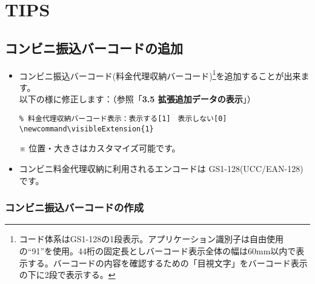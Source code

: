 \documentclass[a4paper,10pt,titlepage]{ltjsarticle}
\def\colH#1{\color[HTML]{#1}}
\newcommand\visibleExtension{1}
\begin{document}
\newpage

\section{TIPS}

\subsection{コンビニ振込バーコードの追加}

\begin{itemize}
  \item {\colH{800000} コンビニ振込バーコード}(料金代理収納バーコード)\footnote{コード体系はGS1-128の1段表示。アプリケーション識別子は自由使用の“91”を使用。44桁の固定長としバーコード表示全体の幅は60mm以内で表示する。バーコードの内容を確認するための「目視文字」をバーコード表示の下に2段で表示する。}を追加することが出来ます。\\
以下の様に修正します：（参照「{\bfseries 3.5 拡張追加データの表示}」）
\begin{verbatim}
% 料金代理収納バーコード表示：表示する[1]　表示しない[0]
\newcommand\visibleExtension{1}
\end{verbatim}
  \item[\hspace{30pt}※] 位置・大きさはカスタマイズ可能です。 
  \item コンビニ料金代理収納に利用されるエンコードは{\colH{800000} GS1-128}(UCC/EAN-128)です。
\end{itemize}

\subsubsection{コンビニ振込バーコードの作成}
\end{document}

